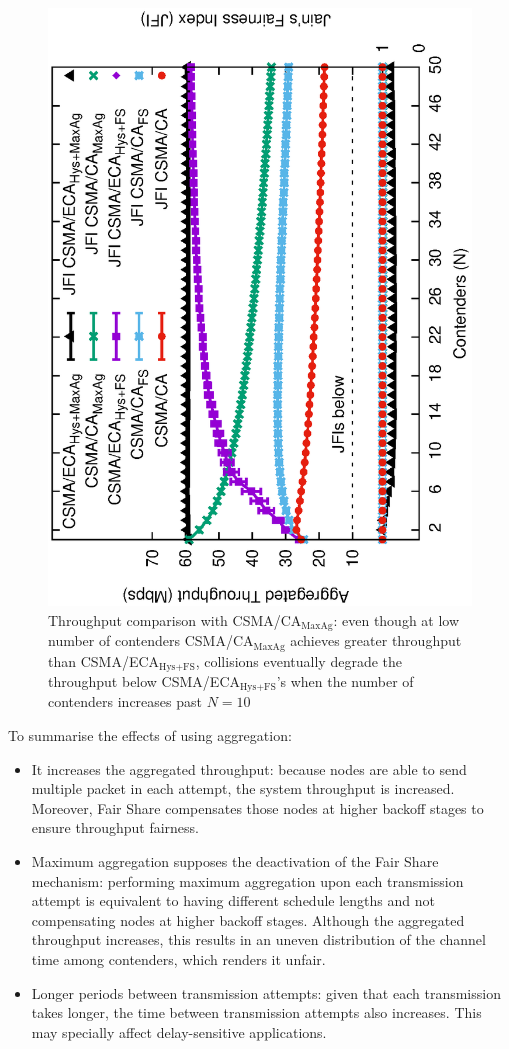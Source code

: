 \documentclass[a4paper,journal]{IEEEtran}
\providecommand{\DIFaddend}{} %
\providecommand{\DIFaddbeginFL}{} %
\providecommand{\DIFaddendFL}{} %
\providecommand{\DIFdelbeginFL}{} %
\providecommand{\DIFdelendFL}{} %
\begin{document}
	\DIFaddend \begin{figure}[tb]
	\centering
		\DIFdelbeginFL %
\DIFdelendFL \DIFaddbeginFL \includegraphics[width=0.7\linewidth,angle=-90]{figures/throughput-max-Ag/throughput-saturated-maxAgg-TON.eps}
		\DIFaddendFL \caption{Throughput comparison with CSMA/CA$_{\text{MaxAg}}$: even though at low number of contenders CSMA/CA$_{\text{MaxAg}}$ achieves greater throughput than CSMA/ECA$_{\text{Hys+FS}}$, collisions eventually degrade the throughput below CSMA/ECA$_{\text{Hys+FS}}$'s when the number of contenders increases past $N=10$}
		\label{fig:ECA-vs-DCF-maxAgg}
	\end{figure}

	To summarise the effects of using aggregation:
	\begin{itemize}
		\item It increases the aggregated throughput: because nodes are able to send multiple packet in each attempt, the system throughput is increased. Moreover, Fair Share compensates those nodes at higher backoff stages to ensure throughput fairness.
		\item Maximum aggregation supposes the deactivation of the Fair Share mechanism: performing maximum aggregation upon each transmission attempt is equivalent to having different schedule lengths and not compensating nodes at higher backoff stages. Although the aggregated throughput increases, this results in an uneven distribution of the channel time among contenders, which renders it unfair.
		\item Longer periods between transmission attempts: given that each transmission takes longer, the time between transmission attempts also increases. This may specially affect delay-sensitive applications.
	\end{itemize}
\end{document}
